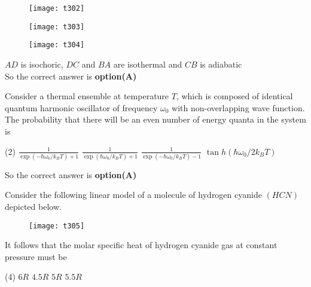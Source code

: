 \begin{questions}
\begin{tasks}
	\task[\textbf{B.}] \begin{figure}[H]
		\centering
		\texttt{[image: t302]}
	\end{figure}
	\task[\textbf{C.}] \begin{figure}[H]
		\centering
		\texttt{[image: t303]}
	\end{figure}
	\task[\textbf{D.}] \begin{figure}[H]
		\centering
		\texttt{[image: t304]}
	\end{figure}
\end{tasks}
\begin{answer}
	$A D$ is isochoric, $D C$ and $B A$ are isothermal and $C B$ is adiabatic\\
	So the correct answer is \textbf{option(A)}
\end{answer}
\begin{minipage}{\textwidth}
	\question Consider a thermal ensemble at temperature $T$, which is composed of identical quantum harmonic oscillator of frequency $\omega_{0}$ with non-overlapping wave function. The probability that there will be an even number of energy quanta in the system is 
\end{minipage}
\begin{tasks}(2)
	\task[\textbf{A.}] $\frac{1}{\exp \left(-\hbar \omega_{0} / k_{B} T\right)+1}$
	\task[\textbf{B.}]   $\frac{1}{\exp \left(\hbar \omega_{0} / k_{B} T\right)+1}$
	\task[\textbf{C.}] $\frac{1}{\exp \left(-\hbar \omega_{0} / k_{B} T\right)-1}$
	\task[\textbf{D.}] $\tan h\left(\hbar \omega_{0} / 2 k_{B} T\right)$
\end{tasks}
\begin{answer}
	So the correct answer is \textbf{option(A)}
\end{answer}
\begin{minipage}{\textwidth}
	\question Consider the following linear model of a molecule of hydrogen cyanide $(H C N)$ depicted below.\\
	\begin{figure}[H]
		\centering
		\texttt{[image: t305]}
	\end{figure}
	It follows that the molar specific heat of hydrogen cyanide gas at constant pressure must be
\end{minipage}
\begin{tasks}(4)
	\task[\textbf{A.}]   $6 R$
	\task[\textbf{B.}] $4.5 R$
	\task[\textbf{C.}] $5 R$
	\task[\textbf{D.}] $5.5 R$

\end{tasks}
\end{questions}
